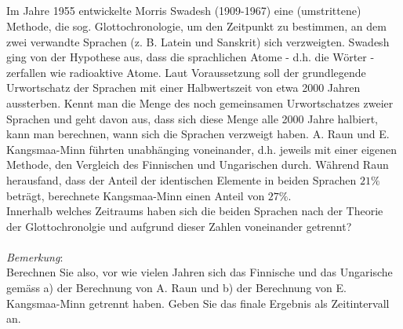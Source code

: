 \subsection*{}
Im Jahre 1955 entwickelte Morris Swadesh (1909-1967) eine (umstrittene) Methode, die sog.
Glottochronologie, um den Zeitpunkt zu bestimmen, an dem zwei verwandte Sprachen (z. B.
Latein und Sanskrit) sich verzweigten. Swadesh ging von der Hypothese aus, dass die sprachlichen
Atome - d.h. die Wörter - zerfallen wie radioaktive Atome. Laut Voraussetzung soll der
grundlegende Urwortschatz der Sprachen mit einer Halbwertszeit von etwa 2000 Jahren aussterben.
Kennt man die Menge des noch gemeinsamen Urwortschatzes zweier Sprachen und geht
davon aus, dass sich diese Menge alle 2000 Jahre halbiert, kann man berechnen, wann sich
die Sprachen verzweigt haben. A. Raun und E. Kangsmaa-Minn führten unabhänging voneinander,
d.h. jeweils mit einer eigenen Methode, den Vergleich des Finnischen und Ungarischen
durch. Während Raun herausfand, dass der Anteil der identischen Elemente in beiden Sprachen
$21 \% $ beträgt, berechnete Kangsmaa-Minn einen Anteil von $ 27 \% $.\\
Innerhalb welches Zeitraums haben sich die beiden Sprachen nach der Theorie der Glottochronolgie
und aufgrund dieser Zahlen voneinander getrennt?\\
\\
\textit{Bemerkung}:\\
Berechnen Sie also, vor wie vielen Jahren sich das Finnische und das Ungarische gemäss a)
der Berechnung von A. Raun und b) der Berechnung von E. Kangsmaa-Minn getrennt haben.
Geben Sie das finale Ergebnis als Zeitintervall an.\\
\\

